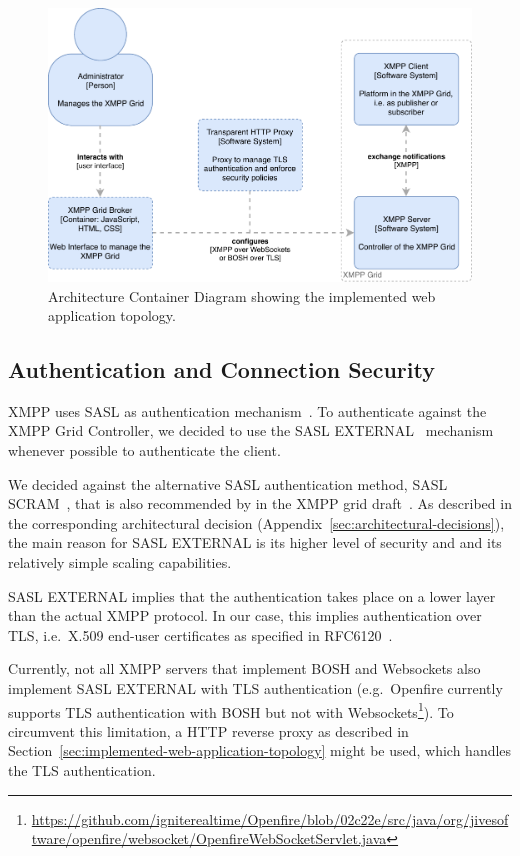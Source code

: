 \begin{figure}[H]
    \centering
    \includegraphics[width=\linewidth]{resources/architecture_container_webapplication_with_http_proxy}
    \caption[Architecture Container Diagram: Web Application with transparent Proxy]{Architecture Container Diagram showing the implemented web application topology.}
    \label{fig:architecturecontainerweb-http-proxy}
\end{figure}
  

\subsection{Authentication and Connection Security}\label{sec:authentication-and-connection-security}

XMPP uses SASL as authentication mechanism~\cite{rfc6120}.
To authenticate against the XMPP Grid Controller, we decided to use the SASL EXTERNAL~\cite{rfc4422} mechanism whenever possible to authenticate the client.

We decided against the alternative SASL authentication method, SASL SCRAM~\cite{rfc7677}, that is also recommended by in the XMPP grid draft~\cite{ietf-mile-xmpp-grid-05}.
As described in the corresponding architectural decision (Appendix~\ref{sec:architectural-decisions}), the main reason for SASL EXTERNAL is its higher level of security and and its relatively simple scaling capabilities.

SASL EXTERNAL implies that the authentication takes place on a lower layer than the actual XMPP protocol. In our case, this implies authentication over TLS, i.e.~X.509 end-user certificates as specified in RFC6120~\cite{rfc6120}.

Currently, not all XMPP servers that implement BOSH and Websockets also implement SASL EXTERNAL with TLS authentication
(e.g.\ Openfire currently supports TLS authentication with BOSH but not with Websockets\footnote{\url{https://github.com/igniterealtime/Openfire/blob/02c22e/src/java/org/jivesoftware/openfire/websocket/OpenfireWebSocketServlet.java}}).
To circumvent this limitation, a HTTP reverse proxy as described in Section~\ref{sec:implemented-web-application-topology} might be used, which handles the TLS authentication.


